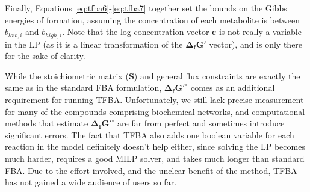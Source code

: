 \documentclass[twocolumn]{bmcart}%
\begin{document}
Finally, Equations \ref{eq:tfba6}-\ref{eq:tfba7} together set the bounds on the Gibbs energies of formation, assuming the concentration of each metabolite is between $b_{low,i}$ and $b_{high,i}$. Note that the log-concentration vector $\mathbf{c}$ is not really a variable in the LP (as it is a linear transformation of the $\mathbf{\Delta_f G'}$ vector), and is only there for the sake of clarity.

While the stoichiometric matrix ($\mathbf{S}$) and general flux constraints are exactly the same as in the standard FBA formulation, $\mathbf{\Delta_f G'^\circ}$ comes as an additional requirement for running TFBA. Unfortunately, we still lack precise measurement for many of the compounds comprising biochemical networks, and computational methods that estimate $\mathbf{\Delta_f G'^\circ}$ \cite{Jankowski2008-hd,Noor2012-mp,Noor2013-an,Jinich2014-nv} are far from perfect and sometimes introduce significant errors. The fact that TFBA also adds one boolean variable for each reaction in the model definitely doesn't help either, since solving the LP becomes much harder, requires a good MILP solver, and takes much longer than standard FBA. Due to the effort involved, and the unclear benefit of the method, TFBA has not gained a wide audience of users so far.
\end{document}
